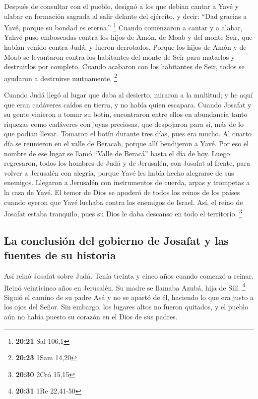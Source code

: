  Después de consultar con el pueblo, designó a los que
debían cantar a Yavé y alabar en formación sagrada al salir delante del
ejército, y decir: ``Dad gracias a Yavé, porque su bondad es eterna.''
\footnote{\textbf{20:21} Sal 106,1}  Cuando comenzaron a
cantar y a alabar, Yahvé puso emboscadas contra los hijos de Amón, de
Moab y del monte Seír, que habían venido contra Judá, y fueron
derrotados.  Porque los hijos de Amón y de Moab se
levantaron contra los habitantes del monte de Seír para matarlos y
destruirlos por completo. Cuando acabaron con los habitantes de Seir,
todos se ayudaron a destruirse mutuamente. \footnote{\textbf{20:23} 1Sam
  14,20}

 Cuando Judá llegó al lugar que daba al desierto, miraron
a la multitud; y he aquí que eran cadáveres caídos en tierra, y no había
quien escapara.  Cuando Josafat y su gente vinieron a
tomar su botín, encontraron entre ellos en abundancia tanto riquezas
como cadáveres con joyas preciosas, que despojaron para sí, más de lo
que podían llevar. Tomaron el botín durante tres días, pues era mucho.
 Al cuarto día se reunieron en el valle de Beracah,
porque allí bendijeron a Yavé. Por eso el nombre de ese lugar se llamó
``Valle de Beracá'' hasta el día de hoy.  Luego
regresaron, todos los hombres de Judá y de Jerusalén, con Josafat al
frente, para volver a Jerusalén con alegría, porque Yavé les había hecho
alegrarse de sus enemigos.  Llegaron a Jerusalén con
instrumentos de cuerda, arpas y trompetas a la casa de Yavé.
 El temor de Dios se apoderó de todos los reinos de los
países cuando oyeron que Yavé luchaba contra los enemigos de Israel.
 Así, el reino de Josafat estaba tranquilo, pues su Dios
le daba descanso en todo el territorio. \footnote{\textbf{20:30} 2Cró
  15,15}

\hypertarget{la-conclusiuxf3n-del-gobierno-de-josafat-y-las-fuentes-de-su-historia}{%
\subsection{La conclusión del gobierno de Josafat y las fuentes de su
historia}\label{la-conclusiuxf3n-del-gobierno-de-josafat-y-las-fuentes-de-su-historia}}

 Así reinó Josafat sobre Judá. Tenía treinta y cinco años
cuando comenzó a reinar. Reinó veinticinco años en Jerusalén. Su madre
se llamaba Azubá, hija de Silí. \footnote{\textbf{20:31} 1Re 22,41-50}
 Siguió el camino de su padre Asá y no se apartó de él,
haciendo lo que era justo a los ojos del Señor.  Sin
embargo, los lugares altos no fueron quitados, y el pueblo aún no había
puesto su corazón en el Dios de sus padres.


